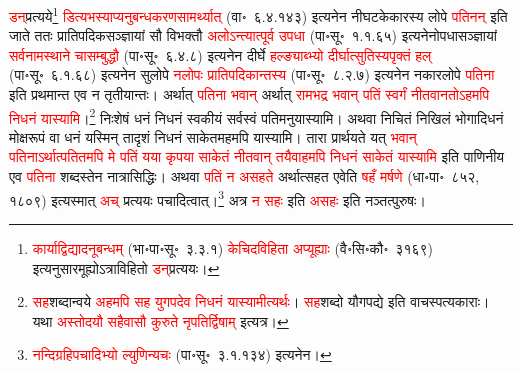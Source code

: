 \begin{sloppypar}
\textcolor{red}{डन्‌}\-प्रत्यये\footnote{\textcolor{red}{कार्याद्विद्यादनूबन्धम्} (भा॰पा॰सू॰~३.३.१) \textcolor{red}{केचिदविहिता अप्यूह्याः} (वै॰सि॰कौ॰~३१६९) इत्यनुसारमूह्योऽ\-त्राविहितो \textcolor{red}{डन्‌}\-प्रत्ययः।} \textcolor{red}{डित्यभस्याप्यनु\-बन्धकरण\-सामर्थ्यात्‌} (वा॰~६.४.१४३) इत्यनेन नी\-घटकेकारस्य लोपे \textcolor{red}{पतिनन्‌} इति जाते ततः प्रातिपदिक\-सञ्ज्ञायां सौ विभक्तौ \textcolor{red}{अलोऽन्त्यात्पूर्व उपधा} (पा॰सू॰~१.१.६५) इत्यनेनोपधा\-सञ्ज्ञायां \textcolor{red}{सर्वनामस्थाने चासम्बुद्धौ} (पा॰सू॰~६.४.८) इत्यनेन दीर्घे \textcolor{red}{हल्ङ्याब्भ्यो दीर्घात्सुतिस्यपृक्तं हल्‌} (पा॰सू॰~६.१.६८) इत्यनेन सुलोपे \textcolor{red}{नलोपः प्रातिपदिकान्तस्य} (पा॰सू॰~८.२.७) इत्यनेन नकार\-लोपे \textcolor{red}{पतिना} इति प्रथमान्त एव न तृतीयान्तः। अर्थात् \textcolor{red}{पतिना भवान्‌} अर्थात् \textcolor{red}{रामभद्र भवान् पतिं स्वर्गं नीतवानतोऽहमपि निधनं यास्यामि}।\footnote{\textcolor{red}{सह}\-शब्दान्वये \textcolor{red}{अहमपि सह युगपदेव निधनं यास्यामीत्यर्थः}। \textcolor{red}{सह}\-शब्दो यौगपद्ये इति वाचस्पत्य\-काराः। यथा \textcolor{red}{अस्तोदयौ सहैवासौ कुरुते नृपतिर्द्विषाम्} इत्यत्र।} निःशेषं धनं निधनं स्वकीयं सर्वस्वं पतिमनु\-यास्यामि। अथवा निचितं निखिलं भोगादि\-धनं मोक्ष\-रूपं वा धनं यस्मिन् तादृशं निधनं साकेतमहमपि यास्यामि। तारा प्रार्थयते यत् \textcolor{red}{भवान् पतिनाऽर्थात्पतितमपि मे पतिं यया कृपया साकेतं नीतवान् तयैवाहमपि निधनं साकेतं यास्यामि} इति पाणिनीय एव \textcolor{red}{पतिना} शब्दस्तेन नात्रासिद्धिः। अथवा \textcolor{red}{पतिं न असहते} अर्थात्सहत एवेति \textcolor{red}{षहँ मर्षणे} (धा॰पा॰~८५२, १८०९) इत्यस्मात् \textcolor{red}{अच्‌} प्रत्ययः पचादित्वात्।\footnote{\textcolor{red}{नन्दि\-ग्रहि\-पचादिभ्यो ल्युणिन्यचः} (पा॰सू॰~३.१.१३४) इत्यनेन।} अत्र \textcolor{red}{न सहः} इति \textcolor{red}{असहः} इति नञ्तत्पुरुषः।

\end{sloppypar}
